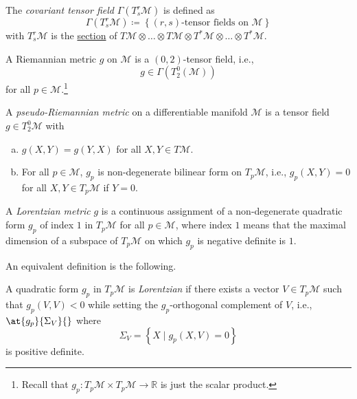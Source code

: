 \begin{definition}\label{def:covariant-tensor-field}
	The \emph{covariant tensor field} \(\Gamma (T_s^r \mathcal{M} )\) is defined as
	\[
		\Gamma (T_s^r \mathcal{M} ) \coloneqq \left\{ \text{\((r,s)\)-tensor fields on } \mathcal{M} \right\}
	\]
	with \(T_s^r \mathcal{M} \) is the \hyperref[def:section]{section} of \(T \mathcal{M} \otimes \ldots \otimes T \mathcal{M} \otimes T^{\ast} \mathcal{M} \otimes \ldots \otimes T^{\ast} \mathcal{M} \).
\end{definition}

\begin{prev}
	A Riemannian metric \(g\) on \(\mathcal{M} \) is a \((0, 2)\)-tensor field, i.e.,
	\[
		g\in \Gamma (T_2^0 (\mathcal{M} ))
	\]
	for all \(p \in \mathcal{M} \).\footnote{Recall that \(g_p\colon T_p \mathcal{M} \times T_p \mathcal{M} \to \mathbb{R} \) is just the scalar product.}
\end{prev}

\begin{definition}\label{def:pseudo-Riemannian-metric}
	A \emph{pseudo-Riemannian metric} on a differentiable manifold \(\mathcal{M} \) is a tensor field \(g\in T_2^0 \mathcal{M} \) with
	\begin{enumerate}[(a)]
		\item \(g(X, Y) = g(Y, X)\) for all \(X, Y\in T \mathcal{M} \).
		\item For all \(p\in \mathcal{M} \), \(g_p\) is non-degenerate bilinear form on \(T_p \mathcal{M} \), i.e., \(g_p(X, Y) = 0\) for all \(X, Y\in T_p \mathcal{M} \) if \(Y = 0\).
	\end{enumerate}
\end{definition}

\begin{definition}\label{def:Lorentzian-metric}
	A \emph{Lorentzian metric} \(g\) is a continuous assignment of a non-degenerate quadratic form \(g_p\) of index \(1\) in \(T_p \mathcal{M} \) for all \(p\in \mathcal{M} \), where index \(1\) means that the maximal dimension of a subspace of \(T_p \mathcal{M} \) on which \(g_p\) is negative definite is \(1\).
\end{definition}

An equivalent definition is the following.

\begin{definition}[Lorentzian]\label{def:Lorentzian}
	A quadratic form \(g_p\) in \(T_{p} \mathcal{M} \) is \emph{Lorentzian} if there exists a vector \(V\in T_p \mathcal{M} \) such that \(g_p(V, V) < 0\) while setting the \(g_p\)-orthogonal complement of \(V\), i.e., \(\at{g_p}{\Sigma _V}{} \) where
	\[
		\Sigma _V = \left\{ X \mid g_p(X, V) = 0 \right\}
	\]
	is positive definite.
\end{definition}

